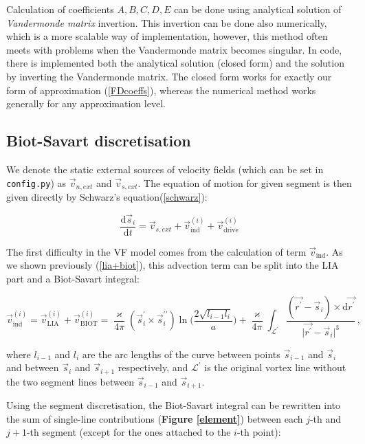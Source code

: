 Calculation of coefficients $A, B, C, D, E$ can be done using analytical solution of \textit{Vandermonde matrix} invertion. This invertion can be done also numerically, which is a more scalable way of implementation, however, this method often meets with problems when the Vandermonde matrix becomes
singular.
In code, there is implemented both the analytical solution (closed form) and the solution by inverting the Vandermonde matrix. The closed form works for exactly our form of approximation (\ref{FDcoeffs}), whereas the numerical method works generally for any approximation level.

\subsection*{Biot-Savart discretisation}

We denote the static external sources of velocity fields (which can be set in \texttt{config.py}) as $\vec{v}_{n,ext}$ and $\vec{v}_{s,ext}$. The equation of motion for given segment is then given directly by Schwarz's equation(\ref{schwarz}):

\begin{equation}
\frac{\text{d}\vec{s}_i}{\text{d}t} =
\vec{v}_{s,ext} + \vec{v}_{\text{ind}}^{(i)} + \vec{v}_{\text{drive}}^{(i)}
\end{equation}

The first difficulty in the VF model comes from the calculation of term $\vec{v}_{\text{ind}}$. As we shown previously (\ref{lia+biot}), this advection term can be split into the LIA part and a Biot-Savart integral:

\begin{equation}
\vec{v}_{\text{ind}}^{(i)} =
\vec{v}_{\text{LIA}}^{(i)} + \vec{v}_{\text{BIOT}}^{(i)} =
\frac{\varkappa}{4\pi} (\vec{s}^{\prime}_i \times \vec{s}^{\prime \prime}_i)
\ln{\Bigg(\frac{2\sqrt{l_{i-1} l_i}}{a}\Bigg)}
+ \frac{\varkappa}{4\pi} \int_{\mathcal{L}^{\prime}} \frac{(\vec{r^{\prime}} - \vec{s}_i) \times \text{d}\vec{r^{\prime}}}{\vert \vec{r^{\prime}} - \vec{s}_i \vert^3}\,,
\end{equation}

where $l_{i-1}$ and $l_i$ are the arc lengths of the curve between
points $\vec{s}_{i-1}$ and $\vec{s}_i$ and between $\vec{s}_i$ and $\vec{s}_{i+1}$ respectively, and $\mathcal{L}^{\prime}$ is the original vortex line without the two segment lines between $\vec{s}_{i-1}$ and $\vec{s}_{i+1}$.

Using the segment discretisation, the Biot-Savart integral can be rewritten \cite{filament} into the sum of single-line contributions (\textbf{Figure \ref{element}}) between each $j$-th and $j+1$-th segment (except for the ones attached to the $i$-th point):

